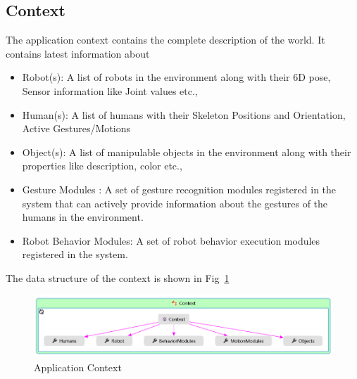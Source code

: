 \subsection{Context}
The application context contains the complete description of the world. It contains latest information about
\begin{itemize}
\item Robot(s): A list of robots in the environment along with their 6D pose, Sensor information like Joint values etc.,
\item Human(s): A list of humans with their Skeleton Positions and Orientation, Active Gestures/Motions
\item Object(s): A list of manipulable objects in the environment along with their properties like description, color etc.,
\item Gesture Modules : A set of gesture recognition modules registered in the system that can actively provide information about the gestures of the humans in the environment.
\item Robot Behavior Modules: A set of robot behavior execution modules registered in the system.
\end{itemize}
The data structure of the context is shown in Fig~\ref{fig:system_context}
\begin{figure}
\centering
\includegraphics[width=\textwidth]{assets/context_diagram.png}
\caption[Application Context]{Application Context}
\label{fig:system_context}
\end{figure}
